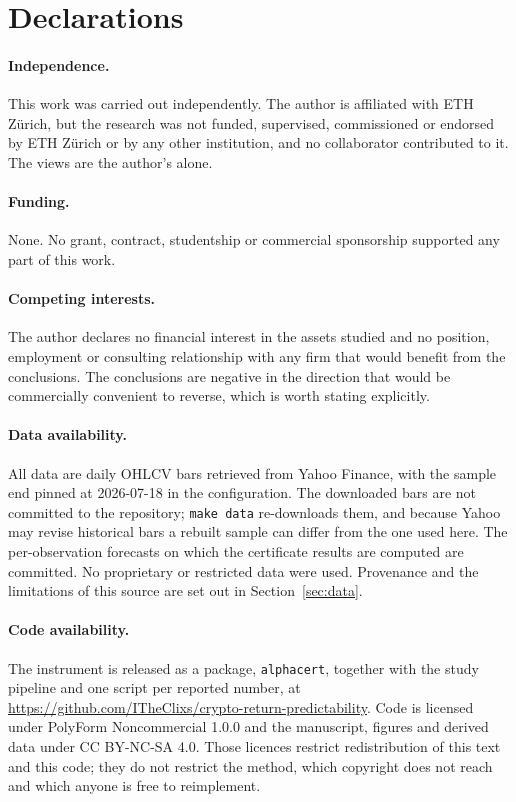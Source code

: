 \documentclass{article}
\theoremstyle{plain}
\theoremstyle{definition}
\begin{document}
\section*{Declarations}

\paragraph{Independence.} This work was carried out independently. The author is affiliated
with ETH Z\"urich, but the research was not funded, supervised, commissioned or endorsed by
ETH Z\"urich or by any other institution, and no collaborator contributed to it. The views
are the author's alone.

\paragraph{Funding.} None. No grant, contract, studentship or commercial sponsorship
supported any part of this work.

\paragraph{Competing interests.} The author declares no financial interest in the assets
studied and no position, employment or consulting relationship with any firm that would
benefit from the conclusions. The conclusions are negative in the direction that would be
commercially convenient to reverse, which is worth stating explicitly.

\paragraph{Data availability.} All data are daily OHLCV bars retrieved from Yahoo Finance,
with the sample end pinned at 2026-07-18 in the configuration. The downloaded bars are not
committed to the repository; \texttt{make data} re-downloads them, and because Yahoo may revise
historical bars a rebuilt sample can differ from the one used here. The per-observation
forecasts on which the certificate results are computed are committed. No proprietary or
restricted data were used. Provenance and the limitations of this source are set out in
Section~\ref{sec:data}.

\paragraph{Code availability.} The instrument is released as a package, \texttt{alphacert},
together with the study pipeline and one script per reported number, at
\url{https://github.com/ITheClixs/crypto-return-predictability}. Code is licensed under
PolyForm Noncommercial 1.0.0 and the manuscript, figures and derived data under
CC BY-NC-SA 4.0. Those licences restrict redistribution of this text and this code; they do
not restrict the method, which copyright does not reach and which anyone is free to
reimplement.
\end{document}
